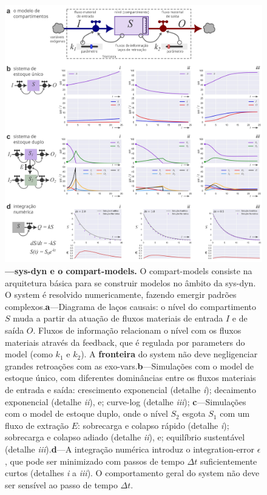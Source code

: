 \documentclass[./main.tex]{subfiles}
\begin{document}
\begin{figure}[t!] %
	\centering				
	\includegraphics[width=0.95\linewidth]{figs/fig_dynamics.jpg}		
	\caption[\gls{sys-dyn} e o \gls{model} de compartimentos]
	{\textbf{---\;\gls{sys-dyn} e o \gls{compart-models}.}\; O \gls{compart-models} consiste na arquitetura básica para se construir modelos no âmbito da \gls{sys-dyn}. O \gls{system} é resolvido numericamente, fazendo emergir padrões complexos.\;\textbf{a}\;---\;Diagrama de laços causais: o nível do compartimento $S$ muda a partir da atuação de fluxos materiais de entrada $I$ e de saída $O$. Fluxos de informação relacionam o nível com os fluxos materiais através da \gls{feedback}, que é regulada por \gls{parameters} do \gls{model} (como $k_1$ e $k_2$). A \textbf{fronteira} do \gls{system} não deve negligenciar grandes retroações com as \gls{exo-vars}.\;\textbf{b}\;---\;Simulações com o \gls{model} de estoque único, com diferentes dominâncias entre os fluxos materiais de entrada e saída: crescimento exponencial (detalhe \textrm{\textit{i}}); decaimento exponencial (detalhe \textrm{\textit{ii}}), e; \gls{curve-log} (detalhe \textrm{\textit{iii}}); \;\textbf{c}\;---\;Simulações com o \gls{model} de estoque duplo, onde o nível $S_2$ esgota $S_1$ com um fluxo de extração $E$: sobrecarga e colapso rápido (detalhe \textrm{\textit{i}}); sobrecarga e colapso adiado (detalhe \textrm{\textit{ii}}), e; equilíbrio sustentável (detalhe \textrm{\textit{iii}}).\;\textbf{d}\;---\;A integração numérica introduz o \gls{integration-error} $\epsilon$, que pode ser minimizado com passos de tempo $\Delta t$ suficientemente curtos (detalhes \textrm{\textit{i}} a \textrm{\textit{iii}}). O comportamento geral do \gls{system} não deve ser sensível ao passo de tempo $\Delta t$.
	}
\label{fig:sys:dynamics}  %
\end{figure}
\end{document}
